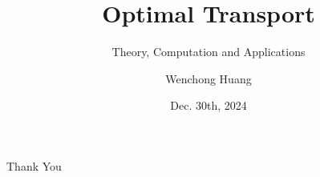 \documentclass[10pt]{beamer}
\author{Wenchong Huang}
\title{Optimal Transport}
\subtitle{Theory, Computation and Applications}
\institute{
    School of Mathematical Sciences, \\
    Zhejiang University.
}
\date{Dec. 30th, 2024}
\begin{document}
\begin{frame}
    \titlepage
\end{frame}







\begin{frame}
    \begin{center}
        {\Huge\calligra Thank You}
    \end{center}
\end{frame}
\end{document}
